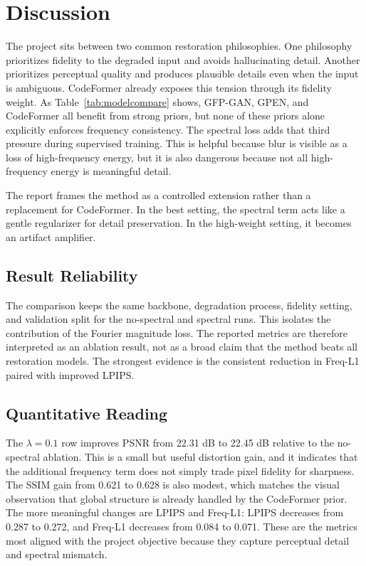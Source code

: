 \documentclass[10pt,twocolumn,letterpaper]{article}
\begin{document}
\section{Discussion}
The project sits between two common restoration philosophies. One philosophy prioritizes fidelity to the degraded input and avoids hallucinating detail. Another prioritizes perceptual quality and produces plausible details even when the input is ambiguous. CodeFormer already exposes this tension through its fidelity weight. As Table~\ref{tab:modelcompare} shows, GFP-GAN, GPEN, and CodeFormer all benefit from strong priors, but none of these priors alone explicitly enforces frequency consistency. The spectral loss adds that third pressure during supervised training. This is helpful because blur is visible as a loss of high-frequency energy, but it is also dangerous because not all high-frequency energy is meaningful detail.

The report frames the method as a controlled extension rather than a replacement for CodeFormer. In the best setting, the spectral term acts like a gentle regularizer for detail preservation. In the high-weight setting, it becomes an artifact amplifier.

\subsection{Result Reliability}
The comparison keeps the same backbone, degradation process, fidelity setting, and validation split for the no-spectral and spectral runs. This isolates the contribution of the Fourier magnitude loss. The reported metrics are therefore interpreted as an ablation result, not as a broad claim that the method beats all restoration models. The strongest evidence is the consistent reduction in Freq-L1 paired with improved LPIPS.

\subsection{Quantitative Reading}
The $\lambda=0.1$ row improves PSNR from 22.31 dB to 22.45 dB relative to the no-spectral ablation. This is a small but useful distortion gain, and it indicates that the additional frequency term does not simply trade pixel fidelity for sharpness. The SSIM gain from 0.621 to 0.628 is also modest, which matches the visual observation that global structure is already handled by the CodeFormer prior. The more meaningful changes are LPIPS and Freq-L1: LPIPS decreases from 0.287 to 0.272, and Freq-L1 decreases from 0.084 to 0.071. These are the metrics most aligned with the project objective because they capture perceptual detail and spectral mismatch.
\end{document}
